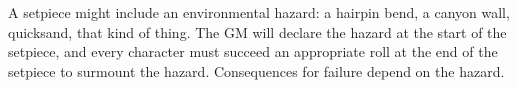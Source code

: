 
A setpiece might include an environmental hazard: a hairpin bend, a canyon wall, quicksand, that kind of thing. The GM will declare the hazard at the start of the setpiece, and every character must succeed an appropriate roll at the end of the setpiece to surmount the hazard. Consequences for failure depend on the hazard.
